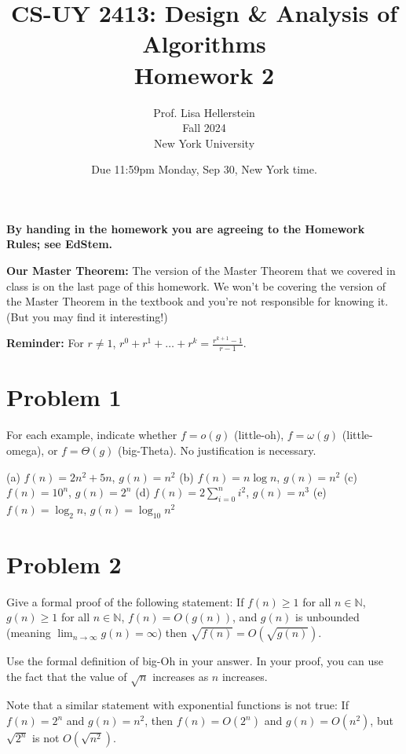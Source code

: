 \documentclass{article}
\begin{document}
\title{CS-UY 2413: Design \& Analysis of Algorithms \\ Homework 2}
\author{Prof. Lisa Hellerstein \\ Fall 2024 \\ New York University}
\date{Due 11:59pm Monday, Sep 30, New York time.}

\maketitle

\textbf{By handing in the homework you are agreeing to the Homework Rules; see EdStem.}

\textbf{Our Master Theorem:} The version of the Master Theorem that we covered in class is on the last page of this homework. We won’t be covering the version of the Master Theorem in the textbook and you’re not responsible for knowing it. (But you may find it interesting!)

\textbf{Reminder:} For $r \neq 1$, $r^0 + r^1 + \dots + r^k = \frac{r^{k+1} - 1}{r - 1}$.

\section*{Problem 1}
For each example, indicate whether $f = o(g)$ (little-oh), $f = \omega(g)$ (little-omega), or $f = \Theta(g)$ (big-Theta). No justification is necessary.

(a) $f(n) = 2n^2 + 5n$, $g(n) = n^2$
(b) $f(n) = n \log n$, $g(n) = n^2$
(c) $f(n) = 10^n$, $g(n) = 2^n$
(d) $f(n) = 2 \sum_{i=0}^n i^2$, $g(n) = n^3$
(e) $f(n) = \log_2 n$, $g(n) = \log_{10} n^2$


\section*{Problem 2}
Give a formal proof of the following statement: If $f(n) \ge 1$ for all $n \in \mathbb{N}$, $g(n) \ge 1$ for all $n \in \mathbb{N}$, $f(n) = O(g(n))$, and $g(n)$ is unbounded (meaning $\lim_{n \to \infty} g(n) = \infty$) then $\sqrt{f(n)} = O(\sqrt{g(n)})$.

Use the formal definition of big-Oh in your answer. In your proof, you can use the fact that the value of $\sqrt{n}$ increases as $n$ increases.

Note that a similar statement with exponential functions is not true: If $f(n) = 2^n$ and $g(n) = n^2$, then $f(n) = O(2^n)$ and $g(n) = O(n^2)$, but $\sqrt{2^n}$ is not $O(\sqrt{n^2})$.
\end{document}
